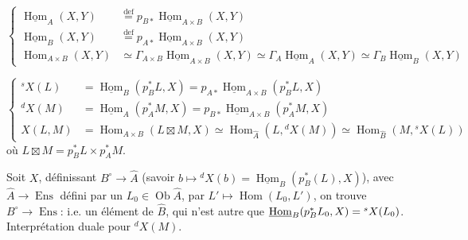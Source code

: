 
\[
\left\{\begin{aligned}
\underline{\operatorname{Hom}}_A(X,Y)&\overset{\mathrm{def}}=p_{B*}\underline{\operatorname{Hom}}_{A\times B}(X,Y)\\
\underline{\operatorname{Hom}}_B(X,Y)&\overset{\mathrm{def}}=p_{A*}\underline{\operatorname{Hom}}_{A\times B}(X,Y)\\
\operatorname{Hom}_{A\times B}(X,Y)&\simeq\Gamma_{A\times B}\underline{\operatorname{Hom}}_{A\times B}(X,Y)
\simeq\Gamma_A\underline{\operatorname{Hom}}_A(X,Y)
\simeq\Gamma_B\underline{\operatorname{Hom}}_B(X,Y)
\end{aligned}\right.
\]

\[
\left\{\begin{aligned}
{}^sX(L)&=\underline{\operatorname{Hom}}_B(p_B^*L,X)
=p_{A*}\underline{\operatorname{Hom}}_{A\times B}(p_B^*L,X)\\
{}^dX(M)&=\underline{\operatorname{Hom}}_A(p_A^*M,X)
=p_{B*}\underline{\operatorname{Hom}}_{A\times B}(p_A^*M,X)\\
X(L,M)&=\operatorname{Hom}_{A\times B}(L\boxtimes M,X)
\simeq\operatorname{Hom}_{\widehat A}(L,{}^dX(M))
\simeq\operatorname{Hom}_{\widehat B}(M,{}^sX(L))
\end{aligned}\right.
\]
où $L\boxtimes M=p_B^*L\times p_A^*M$.


Soit $X$, définissant $B^\circ\longrightarrow\widehat A$
(savoir $b\longmapsto{}^dX(b)=\underline{\operatorname{Hom}}_B(p_B^*(L),X)$),
 avec $\widehat A\longrightarrow\operatorname{Ens}$ défini
par un $L_0\in\operatorname{Ob}\widehat A$, par
$L'\longmapsto\operatorname{Hom}(L_0,L')$, on trouve
$B^\circ\longrightarrow\operatorname{Ens}$: i.e.
un élément de $\widehat B$, qui n'est autre que
$\underline{\operatorname{Hom}}_B(p_B^*{L_0},X)={}^sX(L_0)$.
Interprétation duale pour ${}^dX(M)$.

